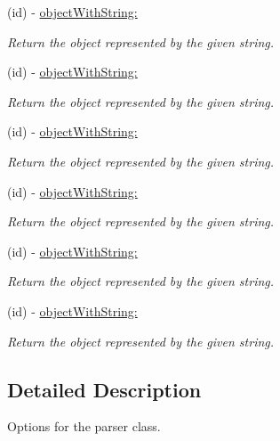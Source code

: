 \begin{DoxyCompactItemize}
\item 
(id) -\/ \hyperlink{protocol_s_b_json_parser-p_a5183c152f4a9e5e79bb9534fcbdf7bf6}{object\-With\-String\-:}
\begin{DoxyCompactList}\small\item\em \-Return the object represented by the given string. \end{DoxyCompactList}\item 
(id) -\/ \hyperlink{protocol_s_b_json_parser-p_a5183c152f4a9e5e79bb9534fcbdf7bf6}{object\-With\-String\-:}
\begin{DoxyCompactList}\small\item\em \-Return the object represented by the given string. \end{DoxyCompactList}\item 
(id) -\/ \hyperlink{protocol_s_b_json_parser-p_a5183c152f4a9e5e79bb9534fcbdf7bf6}{object\-With\-String\-:}
\begin{DoxyCompactList}\small\item\em \-Return the object represented by the given string. \end{DoxyCompactList}\item 
(id) -\/ \hyperlink{protocol_s_b_json_parser-p_a5183c152f4a9e5e79bb9534fcbdf7bf6}{object\-With\-String\-:}
\begin{DoxyCompactList}\small\item\em \-Return the object represented by the given string. \end{DoxyCompactList}\item 
(id) -\/ \hyperlink{protocol_s_b_json_parser-p_a5183c152f4a9e5e79bb9534fcbdf7bf6}{object\-With\-String\-:}
\begin{DoxyCompactList}\small\item\em \-Return the object represented by the given string. \end{DoxyCompactList}\item 
(id) -\/ \hyperlink{protocol_s_b_json_parser-p_a5183c152f4a9e5e79bb9534fcbdf7bf6}{object\-With\-String\-:}
\begin{DoxyCompactList}\small\item\em \-Return the object represented by the given string. \end{DoxyCompactList}\end{DoxyCompactItemize}


\subsection{\-Detailed \-Description}
\-Options for the parser class. 


